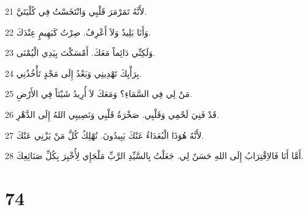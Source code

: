 \par 21 لأَنَّهُ تَمَرْمَرَ قَلْبِي وَانْتَخَسْتُ فِي كُلْيَتَيَّ.
\par 22 وَأَنَا بَلِيدٌ وَلاَ أَعْرِفُ. صِرْتُ كَبَهِيمٍ عِنْدَكَ.
\par 23 وَلَكِنِّي دَائِماً مَعَكَ. أَمْسَكْتَ بِيَدِي الْيُمْنَى.
\par 24 بِرَأْيِكَ تَهْدِينِي وَبَعْدُ إِلَى مَجْدٍ تَأْخُذُنِي.
\par 25 مَنْ لِي فِي السَّمَاءِ؟ وَمَعَكَ لاَ أُرِيدُ شَيْئاً فِي الأَرْضِ.
\par 26 قَدْ فَنِيَ لَحْمِي وَقَلْبِي. صَخْرَةُ قَلْبِي وَنَصِيبِي اللهُ إِلَى الدَّهْرِ.
\par 27 لأَنَّهُ هُوَذَا الْبُعَدَاءُ عَنْكَ يَبِيدُونَ. تُهْلِكُ كُلَّ مَنْ يَزْنِي عَنْكَ.
\par 28 أَمَّا أَنَا فَالاِقْتِرَابُ إِلَى اللهِ حَسَنٌ لِي. جَعَلْتُ بِالسَّيِّدِ الرَّبِّ مَلْجَإِي لِأُخْبِرَ بِكُلِّ صَنَائِعِكَ.

\chapter{74}

